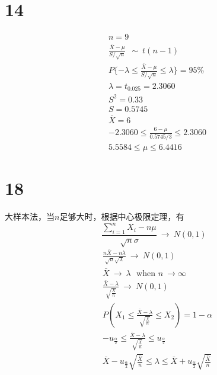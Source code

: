 \documentclass[a4paper,twocolumn]{ctexart}
\begin{document}
\section*{14}
\begin{align*}
&n=9\\
&\frac{\bar{X}-\mu}{S/\sqrt{n}}~~\sim~t(n-1)\\
&P\{-\lambda\le \frac{\bar{X}-\mu}{S/\sqrt{n}}\le \lambda\}=95\%\\
&\lambda=t_{0.025}=2.3060\\
&S^2=0.33\\
&S=0.5745\\
&\bar{X}=6\\
&-2.3060\le \frac{6-\mu}{0.5745/3}\le 2.3060\\
&5.5584\le \mu\le 6.4416
\end{align*}

\section*{18}
大样本法，当$n$足够大时，根据中心极限定理，有
\[
\frac{\sum_{i=1}^{n}X_i-n\mu}{\sqrt{n}\sigma}~\to~N(0,1)
\]
\begin{align*}
&\frac{n\bar{X}-n\lambda}{\sqrt{n}\sqrt{\lambda}}~\to~N(0,1)\\
&\bar{X}~\to~\lambda  \text{~~when }n~\to \infty\\
&\frac{\bar{X}-\lambda}{\sqrt{\frac{\bar{X}}{n}}}~\to~N(0,1)\\
&P(X_1\le \frac{\bar{X}-\lambda}{\sqrt{\frac{\bar{X}}{n}}} \le X_2)=1-\alpha\\
&-u_{\frac{\alpha}{2}}\le\frac{\bar{X}-\lambda}{\sqrt{\frac{\bar{X}}{n}}}\le u_{\frac{\alpha}{2}}\\
&\bar{X}-u_{\frac{\alpha}{2}}\sqrt{\frac{\bar{X}}{n}}\le \lambda\le\bar{X}+u_{\frac{\alpha}{2}}\sqrt{\frac{\bar{X}}{n}}
\end{align*}
\end{document}
